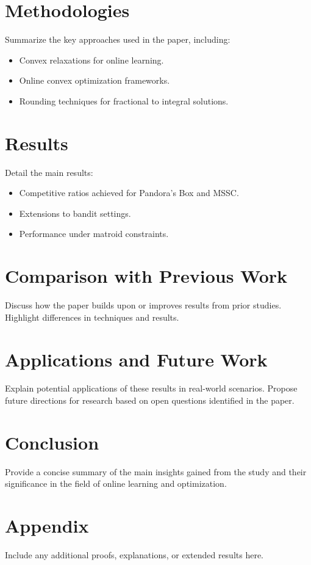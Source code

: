 \documentclass[11pt,a4paper]{article}
\begin{document}
\section{Methodologies}
Summarize the key approaches used in the paper, including:
\begin{itemize}
    \item Convex relaxations for online learning.
    \item Online convex optimization frameworks.
    \item Rounding techniques for fractional to integral solutions.
\end{itemize}

\section{Results}
Detail the main results:
\begin{itemize}
    \item Competitive ratios achieved for Pandora's Box and MSSC.
    \item Extensions to bandit settings.
    \item Performance under matroid constraints.
\end{itemize}

\section{Comparison with Previous Work}
Discuss how the paper builds upon or improves results from prior studies. Highlight differences in techniques and results.

\section{Applications and Future Work}
Explain potential applications of these results in real-world scenarios. Propose future directions for research based on open questions identified in the paper.

\section{Conclusion}
Provide a concise summary of the main insights gained from the study and their significance in the field of online learning and optimization.

\appendix
\section{Appendix}
Include any additional proofs, explanations, or extended results here.



\end{document}
